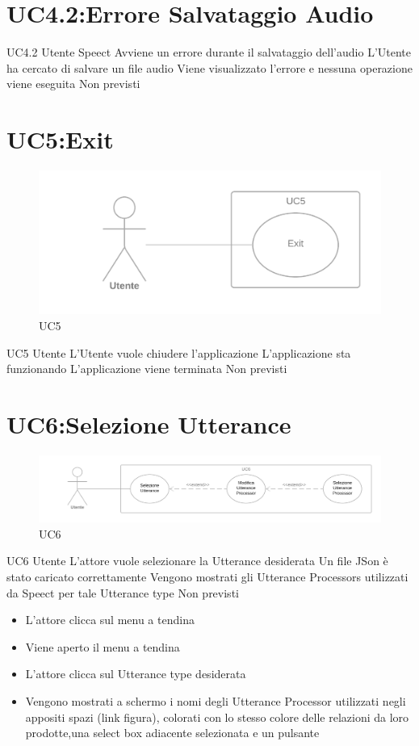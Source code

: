 \documentclass[../AnalisideiRequisiti.tex]{subfiles}
\begin{document}
\section{UC4.2:Errore Salvataggio Audio}
\UserCase
{UC4.2}
{Utente}
{Speect}
{Avviene un errore durante il salvataggio dell'audio}
{L'Utente ha cercato di salvare un file audio}
{Viene visualizzato l'errore e nessuna operazione viene eseguita}
{Non previsti}
{}

\section{UC5:Exit}
\begin{figure}[htp]
	\caption{UC5}
	\centering
	\includegraphics[width=\textwidth]{../img/UC05.png}
\end{figure}
\UserCase
{UC5}
{Utente}
{}
{L'Utente vuole chiudere l'applicazione }
{L'applicazione sta funzionando}
{L'applicazione viene terminata}
{Non previsti}
{
}

\section{UC6:Selezione Utterance}
\begin{figure}[htp]
	\caption{UC6}
	\centering
	\includegraphics[width=\textwidth]{../img/UC06.png}
\end{figure}
\UserCase
{UC6}
{Utente}
{}
{L'attore vuole selezionare la Utterance desiderata}
{Un file JSon è stato caricato  correttamente }
{Vengono mostrati gli Utterance Processors utilizzati da Speect per tale Utterance type}
{Non previsti}
{
	\begin{itemize}
		\item{} L'attore clicca sul menu a tendina
		\item{} Viene aperto il menu a tendina
		\item{} L'attore clicca sul Utterance type desiderata
		\item{} Vengono mostrati a schermo i nomi degli Utterance Processor utilizzati negli appositi spazi (link figura), colorati con lo stesso colore delle relazioni da loro prodotte,una select box adiacente selezionata e un pulsante
		
	\end{itemize}
}
\end{document}
